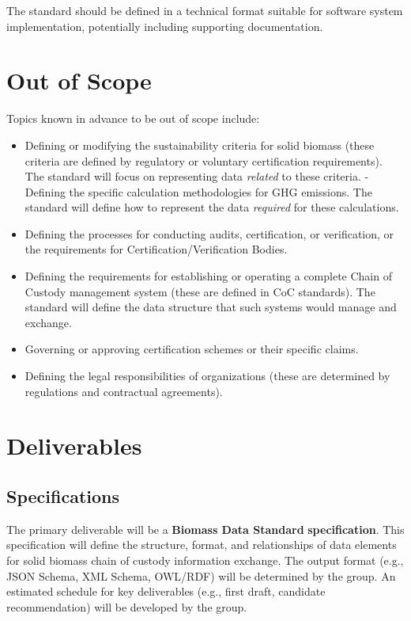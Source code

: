 \documentclass[title=small,preset=opensansnote,par=skip]{article}
\begin{document}
The standard should be defined in a technical format suitable for software system implementation, potentially including supporting documentation.
\section{Out of Scope}
\label{sec:org686f2db}

Topics known in advance to be out of scope include:

\begin{itemize}
\item Defining or modifying the sustainability criteria for solid biomass   (these criteria are defined by regulatory or voluntary certification requirements). The   standard will focus on representing data \emph{related} to these criteria. - Defining the specific calculation methodologies for GHG emissions. The standard will define how to represent the data   \emph{required} for these calculations.
\item Defining the processes for conducting audits, certification, or   verification, or the requirements for Certification/Verification   Bodies.
\item Defining the requirements for establishing or operating a complete   Chain of Custody management system (these are defined in CoC standards). The standard will define the   data structure that such systems would manage and exchange.
\item Governing or approving certification schemes or their specific claims.
\item Defining the legal responsibilities of organizations (these are   determined by regulations and contractual agreements).
\end{itemize}
\section{Deliverables}
\label{sec:orge97db6b}

\subsection{Specifications}
\label{sec:orga1e5f46}
The primary deliverable will be a \textbf{Biomass Data Standard} \textbf{specification}. This specification will define the structure, format, and relationships of data elements for solid biomass chain of custody information exchange. The output format (e.g., JSON Schema, XML Schema, OWL/RDF) will be determined by the group. An estimated schedule for key deliverables (e.g., first draft, candidate recommendation) will be developed by the group.
\end{document}
